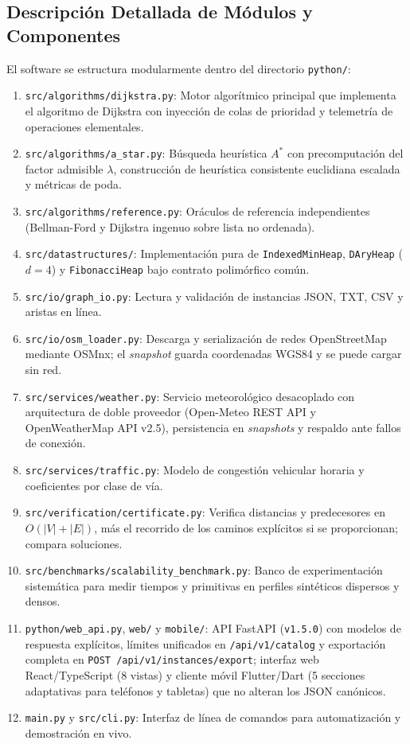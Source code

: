 \subsection{Descripción Detallada de Módulos y Componentes}
El software se estructura modularmente dentro del directorio \texttt{python/}:
\begin{enumerate}
    \item \texttt{src/algorithms/dijkstra.py}: Motor algorítmico principal que implementa el algoritmo de Dijkstra con inyección de colas de prioridad y telemetría de operaciones elementales.
    \item \texttt{src/algorithms/a\_star.py}: Búsqueda heurística $A^*$ con precomputación del factor admisible $\lambda$, construcción de heurística consistente euclidiana escalada y métricas de poda.
    \item \texttt{src/algorithms/reference.py}: Oráculos de referencia independientes (Bellman-Ford y Dijkstra ingenuo sobre lista no ordenada).
    \item \texttt{src/datastructures/}: Implementación pura de \texttt{IndexedMinHeap}, \texttt{DAryHeap} ($d=4$) y \texttt{FibonacciHeap} bajo contrato polimórfico común.
    \item \texttt{src/io/graph\_io.py}: Lectura y validación de instancias JSON, TXT, CSV y aristas en línea.
    \item \texttt{src/io/osm\_loader.py}: Descarga y serialización de redes OpenStreetMap mediante OSMnx; el \textit{snapshot} guarda coordenadas WGS84 y se puede cargar sin red.
    \item \texttt{src/services/weather.py}: Servicio meteorológico desacoplado con arquitectura de doble proveedor (Open-Meteo REST API y OpenWeatherMap API v2.5), persistencia en \textit{snapshots} y respaldo ante fallos de conexión.
    \item \texttt{src/services/traffic.py}: Modelo de congestión vehicular horaria y coeficientes por clase de vía.
    \item \texttt{src/verification/certificate.py}: Verifica distancias y predecesores en $O(|V|+|E|)$, más el recorrido de los caminos explícitos si se proporcionan; compara soluciones.
    \item \texttt{src/benchmarks/scalability\_benchmark.py}: Banco de experimentación sistemática para medir tiempos y primitivas en perfiles sintéticos dispersos y densos.
    \item \texttt{python/web\_api.py}, \texttt{web/} y \texttt{mobile/}: API FastAPI (\texttt{v1.5.0}) con modelos de respuesta explícitos, límites unificados en \texttt{/api/v1/catalog} y exportación completa en \texttt{POST /api/v1/instances/export}; interfaz web React/TypeScript (8 vistas) y cliente móvil Flutter/Dart (5 secciones adaptativas para teléfonos y tabletas) que no alteran los JSON canónicos.
    \item \texttt{main.py} y \texttt{src/cli.py}: Interfaz de línea de comandos para automatización y demostración en vivo.
\end{enumerate}

